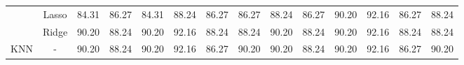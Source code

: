 \begin{landscape}
\begin{table}[]
{\begin{tabular}{cc|clllllclllll}
				& Lasso                                 & 84.31                                                             & 86.27                                                                & 84.31                                                                & 88.24                                                               & 86.27                                                            & \multicolumn{1}{c|}{86.27}                                                                   & 88.24                                                             & 86.27                                                                & 90.20                                                                & 92.16                                                               & 86.27                                                            & 88.24                                                                   \\ 
				& Ridge                                 & 90.20                                                             & 88.24                                                                & 90.20                                                                & 92.16                                                               & 88.24                                                            & \multicolumn{1}{c|}{88.24}                                                                   & 90.20                                                             & 88.24                                                                & 90.20                                                                & 92.16                                                               & 88.24                                                            & 88.24                                                                   \\ \hline
				KNN                             & -                                     & 90.20                                                             & 88.24                                                                & 90.20                                                                & 92.16                                                               & 86.27                                                            & \multicolumn{1}{c|}{90.20}                                                                   & 90.20                                                             & 88.24                                                                & 90.20                                                                & 92.16                                                               & 86.27                                                            & 90.20                                                                   \\ \hline

\end{tabular}}
\end{table}
\end{landscape}
